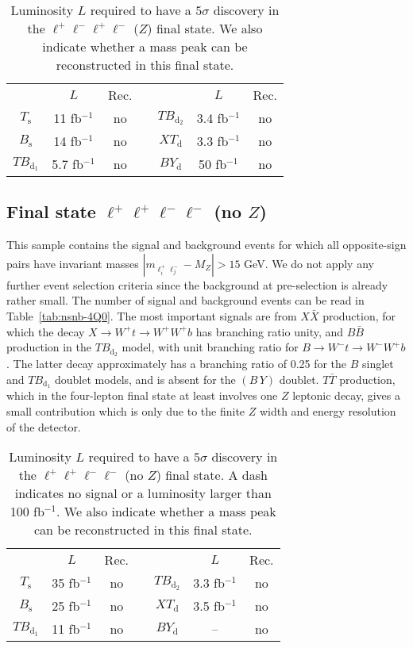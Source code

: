 \documentclass[12pt,a4paper]{article}
\newcommand{\fbin}{fb$^{-1}$}
\newcommand{\Ts}{T_\text{s}}
\newcommand{\Bs}{B_\text{s}}
\newcommand{\TBd}{TB_{\text{d}_1}}
\newcommand{\TBD}{TB_{\text{d}_2}}
\newcommand{\XTd}{XT_\text{d}}
\newcommand{\BYd}{BY_\text{d}}
\newcommand{\BY}{(B \, Y)}
\begin{document}
\begin{table}[t]
\begin{center}
\begin{tabular}{ccccccc}
       & $L$      & Rec. & \quad &        & $L$       & Rec. \\[1mm]
$\Ts$  & 11 \fbin & no   &       & $\TBD$ & 3.4 \fbin & no \\
$\Bs$  & 14 \fbin & no   &       & $\XTd$ & 3.3 \fbin & no \\
$\TBd$ & 5.7 \fbin & no  &       & $\BYd$ & 50 \fbin        & no
\end{tabular}
\end{center}
\caption{Luminosity $L$ required to have a $5\sigma$ discovery in the $\ell^+ \ell^- \ell^+ \ell^-$ ($Z$) final state.
We also indicate whether a mass peak can be reconstructed in this final state.}
\label{tab:sig-4Q0-Z}
\end{table}



\subsection{Final state $\ell^+ \ell^+ \ell^- \ell^-$ (no $Z$)}


This sample contains the signal and background events for which all opposite-sign pairs have invariant masses $|m_{\ell_i^+ \ell_j^-} - M_Z| > 15$ GeV. We do not apply any further event selection criteria since the background at pre-selection is already rather small. The number of signal and background events can be read in Table~\ref{tab:nsnb-4Q0}. The most important signals are from $X \bar X$ production, for which the decay $X \to W^+ t \to W^+ W^+ b$ has branching ratio unity, and $B \bar B$ production in the $\TBD$ model, with unit branching ratio for
$B \to W^- t \to W^- W^+ b$. The latter decay approximately has a branching ratio of 0.25 for the $B$ singlet and $\TBd$ doublet models, and is absent for the $\BY$ doublet.
$T \bar T$ production, which in the four-lepton final state at least involves one $Z$ leptonic decay, gives a small contribution which is only due to the finite $Z$ width and energy resolution of the detector. 

\begin{table}[h]
\begin{center}
\begin{tabular}{ccccccc}
       & $L$      & Rec. & \quad &        & $L$       & Rec. \\[1mm]
$\Ts$  & 35 \fbin & no   &       & $\TBD$ & 3.3 \fbin & no \\
$\Bs$  & 25 \fbin & no   &       & $\XTd$ & 3.5 \fbin & no \\
$\TBd$ & 11 \fbin & no   &       & $\BYd$ & --        & no
\end{tabular}
\end{center}
\caption{Luminosity $L$ required to have a $5\sigma$ discovery in the $\ell^+ \ell^+ \ell^- \ell^-$ (no $Z$) final state. A dash indicates no signal or a luminosity larger than 100 \fbin.
We also indicate whether a mass peak can be reconstructed in this final state.}
\label{tab:sig-4Q0-noZ}
\end{table}
\end{document}
